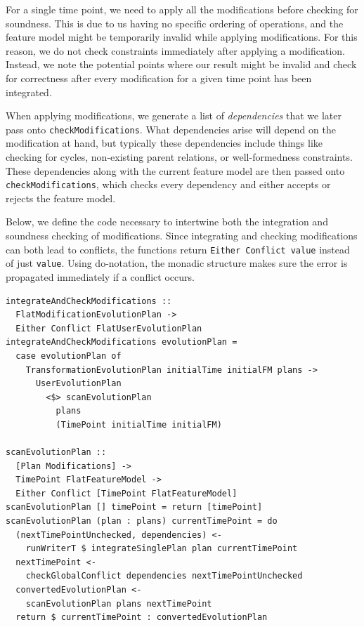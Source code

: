 \documentclass[a4paper,english]{ifimaster}
\begin{document}
For a single time point, we need to apply all the modifications before checking for soundness. This is due to us having no specific ordering of operations, and the feature model might be temporarily invalid while applying modifications. For this reason, we do not check constraints immediately after applying a modification. Instead, we note the potential points where our result might be invalid and check for correctness after every modification for a given time point has been integrated.

When applying modifications, we generate a list of \textit{dependencies} that we later pass onto \texttt{check\-Modifications}. What dependencies arise will depend on the modification at hand, but typically these dependencies include things like checking for cycles, non-existing parent relations, or well-formedness constraints. These dependencies along with the current feature model are then passed onto \texttt{check\-Modifications}, which checks every dependency and either accepts or rejects the feature model.

Below, we define the code necessary to intertwine both the integration and soundness checking of modifications. Since integrating and checking modifications can both lead to conflicts, the functions return \texttt{Either Conflict value} instead of just \texttt{value}. Using do-notation, the monadic structure makes sure the error is propagated immediately if a conflict occurs.

\begin{verbatim}
integrateAndCheckModifications ::
  FlatModificationEvolutionPlan ->
  Either Conflict FlatUserEvolutionPlan
integrateAndCheckModifications evolutionPlan =
  case evolutionPlan of
    TransformationEvolutionPlan initialTime initialFM plans ->
      UserEvolutionPlan
        <$> scanEvolutionPlan
          plans
          (TimePoint initialTime initialFM)

scanEvolutionPlan ::
  [Plan Modifications] ->
  TimePoint FlatFeatureModel ->
  Either Conflict [TimePoint FlatFeatureModel]
scanEvolutionPlan [] timePoint = return [timePoint]
scanEvolutionPlan (plan : plans) currentTimePoint = do
  (nextTimePointUnchecked, dependencies) <-
    runWriterT $ integrateSinglePlan plan currentTimePoint
  nextTimePoint <-
    checkGlobalConflict dependencies nextTimePointUnchecked
  convertedEvolutionPlan <-
    scanEvolutionPlan plans nextTimePoint
  return $ currentTimePoint : convertedEvolutionPlan
\end{verbatim}
\end{document}
